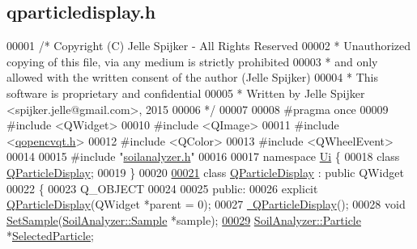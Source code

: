 \hypertarget{qparticledisplay_8h_source}{}\subsection{qparticledisplay.\+h}
\label{qparticledisplay_8h_source}

\begin{DoxyCode}
00001 \textcolor{comment}{/* Copyright (C) Jelle Spijker - All Rights Reserved}
00002 \textcolor{comment}{ * Unauthorized copying of this file, via any medium is strictly prohibited}
00003 \textcolor{comment}{ * and only allowed with the written consent of the author (Jelle Spijker)}
00004 \textcolor{comment}{ * This software is proprietary and confidential}
00005 \textcolor{comment}{ * Written by Jelle Spijker <spijker.jelle@gmail.com>, 2015}
00006 \textcolor{comment}{ */}
00007 
00008 \textcolor{preprocessor}{#pragma once}
00009 \textcolor{preprocessor}{#include <QWidget>}
00010 \textcolor{preprocessor}{#include <QImage>}
00011 \textcolor{preprocessor}{#include <\hyperlink{qopencvqt_8h}{qopencvqt.h}>}
00012 \textcolor{preprocessor}{#include <QColor>}
00013 \textcolor{preprocessor}{#include <QWheelEvent>}
00014 
00015 \textcolor{preprocessor}{#include "\hyperlink{soilanalyzer_8h}{soilanalyzer.h}"}
00016 
00017 \textcolor{keyword}{namespace }\hyperlink{namespace_ui}{Ui} \{
00018   \textcolor{keyword}{class }\hyperlink{class_q_particle_display}{QParticleDisplay};
00019 \}
00020 
\hypertarget{qparticledisplay_8h_source_l00021}{}\hyperlink{class_q_particle_display}{00021} \textcolor{keyword}{class }\hyperlink{class_q_particle_display}{QParticleDisplay} : \textcolor{keyword}{public} QWidget
00022 \{
00023   Q\_OBJECT
00024 
00025 \textcolor{keyword}{public}:
00026   \textcolor{keyword}{explicit} \hyperlink{class_q_particle_display_a552bc093c084d6212b6b4ace6f14c3d1}{QParticleDisplay}(QWidget *parent = 0);
00027   \hyperlink{class_q_particle_display_af942373a3774f1fbe7f8465a263ff473}{~QParticleDisplay}();
00028   \textcolor{keywordtype}{void} \hyperlink{class_q_particle_display_a31d8350736e4d39b9d2391ee8e6edc65}{SetSample}(\hyperlink{class_soil_analyzer_1_1_sample}{SoilAnalyzer::Sample} *sample);
\hypertarget{qparticledisplay_8h_source_l00029}{}\hyperlink{class_q_particle_display_ab89d53c5fd63b606de0a3c2e4446d8c1}{00029}   \hyperlink{class_soil_analyzer_1_1_particle}{SoilAnalyzer::Particle} *\hyperlink{class_q_particle_display_ab89d53c5fd63b606de0a3c2e4446d8c1}{SelectedParticle};

\end{DoxyCode}
